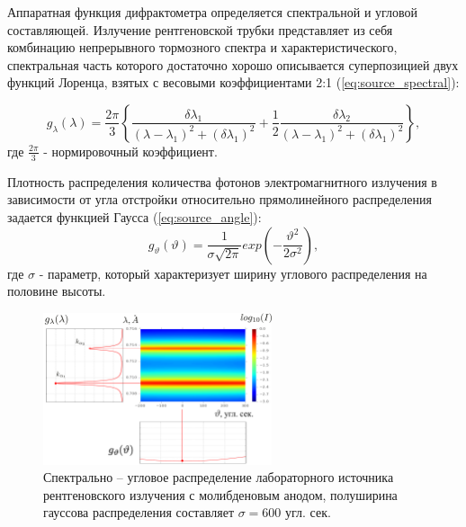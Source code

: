 \label{sec:source_section}
Аппаратная функция дифрактометра определяется спектральной и угловой
составляющей. Излучение рентгеновской трубки представляет из себя комбинацию
 непрерывного тормозного спектра \cite{blohin1957} и характеристического, спектральная часть
 которого достаточно хорошо описывается суперпозицией двух функций Лоренца, взятых с
 весовыми коэффициентами 2:1 (\ref{eq:source_spectral}):

 \begin{equation} \label{eq:source_spectral}
   g_{\lambda} (\lambda) = \frac{2\pi}{3}  \left \{ \frac{\delta\lambda_1}{(\lambda - \lambda_1)^2+
   (\delta \lambda_1)^2} + \frac{1}{2} \frac{\delta\lambda_2}{(\lambda-\lambda_1)^2+(\delta\lambda_1)^2} \right \},
  \end{equation}
\noindent
где $\frac{2\pi}{3}$ - нормировочный коэффициент.

  Плотность распределения количества фотонов электромагнитного излучения в зависимости от угла
  отстройки относительно прямолинейного распределения задается функцией Гаусса (\ref{eq:source_angle}):
\begin{equation} \label{eq:source_angle}
  g_{\vartheta} (\vartheta) = \frac{1}{\sigma \sqrt{ 2\pi}} exp  ( -\frac{\vartheta^2}{2\sigma^2} ),
 \end{equation}
\noindent
где $\sigma$ - параметр, который характеризует ширину углового распределения на половине высоты.

\begin{figure}[H]
  \centering
  \includegraphics[width=0.6\textwidth]{images/source_distrubition.png}
  \caption{Спектрально – угловое распределение лабораторного источника рентгеновского
   излучения с молибденовым анодом, полуширина гауссова распределения составляет $\sigma = 600$ угл. сек. }
  \label{ris:source_distrubition}
\end{figure}
